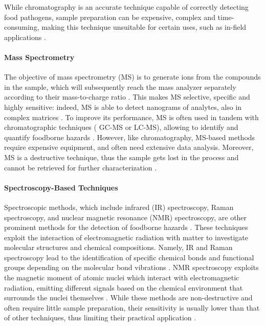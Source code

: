 While chromatography is an accurate technique capable of correctly detecting
food pathogens, sample preparation can be expensive, complex and time-consuming,
making this technique unsuitable for certain uses, such as in-field applications
\citep{vuckovicCurrent2012,heDetection2021}.

\paragraph{Mass Spectrometry}
The objective of mass spectrometry (MS) is to generate ions from the compounds
in the sample, which will subsequently reach the mass analyzer separately
according to their mass-to-charge ratio \citep{franzenMassenspektrometrie1969}.
This makes MS selective, specific and highly sensitive: indeed, MS is able to
detect nanograms of analytes, also in complex matrices
\citep{nwachukwuRecent2024}. To improve its performance, MS is often used in
tandem with chromatographic techniques (\ie{} GC-MS or LC-MS), allowing to
identify and quantify foodborne hazards
\citep{putriApplication2022,zhongUntargeted2022}. However, like chromatography,
MS-based methods require expensive equipment, and often need extensive data
analysis. Moreover, MS is a destructive technique, thus the sample gets lost in
the process and cannot be retrieved for further characterization
\citep{cortes-herreraLiquid2019,artaviaSelected2021}.

\paragraph{Spectroscopy-Based Techniques}
Spectroscopic methods, which include infrared (IR) spectroscopy, Raman
spectroscopy, and nuclear magnetic resonance (NMR) spectroscopy, are other
prominent methods for the detection of foodborne hazards
\citep{heDetection2021}. These techniques exploit the interaction of
electromagnetic radiation with matter to investigate molecular structures and
chemical compositions. Namely, IR and Raman spectroscopy lead to the
identification of specific chemical bonds and functional groups depending on the
molecular bond vibrations \citep{quApplications2015,petersenApplication2021}.
NMR spectroscopy exploits the magnetic moment of atomic nuclei which interact
with electromagnetic radiation, emitting different signals based on the chemical
environment that surrounds the nuclei themselves \citep{hatzakisNuclear2019}.
While these methods are non-destructive and often require little sample
preparation, their sensitivity is usually lower than that of other techniques,
thus limiting their practical application \citep{emwasStrengths2015}.

